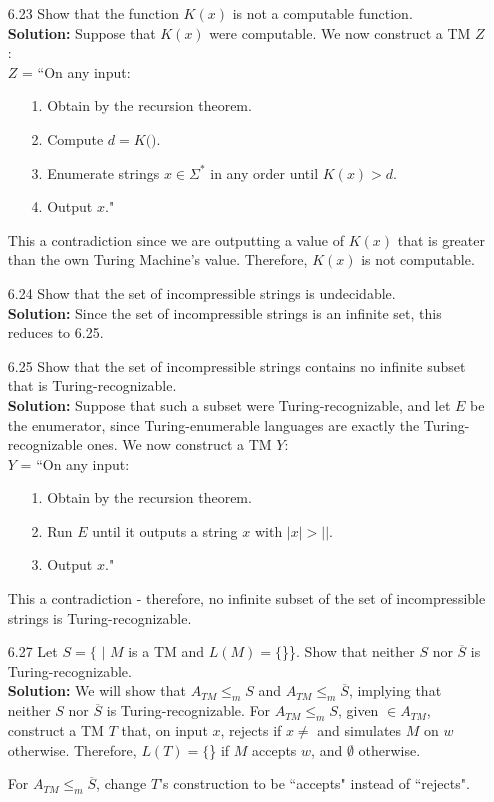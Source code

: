 \begin{enumerate}
\item[6.23]Show that the function $K(x)$ is not a computable function.
\\
\textbf{Solution:} Suppose that $K(x)$ were computable. We now construct a TM $Z$:
\\
$Z$ = ``On any input:
\begin{enumerate}
\itemsep0em
\item[1.]Obtain  by the recursion theorem.
\item[2.]Compute $d = K($$)$.
\item[3.]Enumerate strings $x \in \Sigma^*$ in any order until $K(x) > d$.
\item[4.]Output $x$."
\end{enumerate}
This a contradiction since we are outputting a value of $K(x)$ that is greater than the own Turing Machine's value. Therefore, $K(x)$ is not computable.

\item[6.24]Show that the set of incompressible strings is undecidable.
\\
\textbf{Solution:} Since the set of incompressible strings is an infinite set, this reduces to 6.25.

\item[6.25]Show that the set of incompressible strings contains no infinite subset that is Turing-recognizable.
\\
\textbf{Solution:} Suppose that such a subset were Turing-recognizable, and let $E$ be the enumerator, since Turing-enumerable languages are exactly the Turing-recognizable ones. We now construct a TM $Y$:
\\
$Y$ = ``On any input:
\begin{enumerate}
\itemsep0em
\item[1.]Obtain  by the recursion theorem.
\item[2.]Run $E$ until it outputs a string $x$ with $|x| > |$$|$.
\item[3.]Output $x$."
\end{enumerate}
This a contradiction - therefore, no infinite subset of the set of incompressible strings is Turing-recognizable.

\item[6.27]Let $S = \{$ $|$ $M$ is a TM and $L(M) = \{$\}\}. Show that neither $S$ nor $\overline{S}$ is Turing-recognizable.
\\
\textbf{Solution:} We will show that $A_{TM} \le_m S$ and $A_{TM} \le_m \overline{S}$, implying that neither $S$ nor $\overline{S}$ is Turing-recognizable. For $A_{TM} \le_m S$, given  $\in A_{TM}$, construct a TM $T$ that, on input $x$, rejects if $x \ne$  and simulates $M$ on $w$ otherwise. Therefore, $L(T) = \{$\} if $M$ accepts $w$, and $\emptyset$ otherwise.

\par For $A_{TM} \le_m \overline{S}$, change $T$'s construction to be ``accepts" instead of ``rejects". 
\end{enumerate}